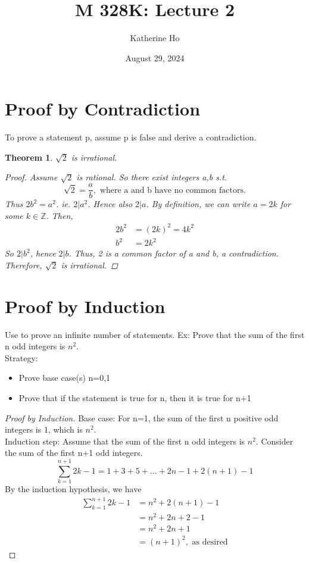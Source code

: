 \documentclass[letterpaper]{article}
\title{M 328K: Lecture 2}
\author{Katherine Ho}
\date{August 29, 2024}
\newtheorem{theorem}{Theorem}[section]
\begin{document}
\maketitle

\section{Proof by Contradiction}
    To prove a statement p, assume p is false and derive a contradiction.
    \begin{theorem}
        $\sqrt{2}$ is irrational.
        \begin{proof}
            Assume $\sqrt{2}$ is rational.
            So there exist integers a,b s.t. 
            \[
                \sqrt{2} = \frac{a}{b}, \text{ where a and b have no common factors.}
            \]
            Thus $2b^2=a^2$. ie. $2|a^2$.
            Hence also $2|a$. By definition, we can write $a=2k$ for some $k\in\mathbb{Z}$.
            Then,
            \begin{align*}
                2b^2 &= (2k)^2 = 4k^2 \\
                b^2 &= 2k^2
            \end{align*}
            So $2|b^2$, hence $2|b$.
            Thus, 2 is a common factor of a and b, a contradiction. \\
            Therefore, $\sqrt{2}$ is irrational.
        \end{proof}
    \end{theorem}

\section{Proof by Induction}
    Use to prove an infinite number of statements. 
    Ex: Prove that the sum of the first n odd integers is $n^2$. \\
    Strategy: 
    \begin{itemize}
        \item Prove base case(s) n=0,1
        \item Prove that if the statement is true for n, then it is true for n+1
    \end{itemize}

    \begin{proof} [Proof by Induction]
        Base case: For n=1, the sum of the first n positive odd integers is 1, which is $n^2$. \\
        Induction step: Assume that the sum of the first n odd integers is $n^2$.
        Consider the sum of the first n+1 odd integers.
        \[
            \sum_{k=1}^{n+1}2k-1 = 1+3+5+\dots+2n-1+2(n+1)-1
        \]
        By the induction hypothesis, we have
        \begin{align*}
            \sum_{k=1}^{n+1}2k-1 &= n^2+2(n+1)-1 \\
            &= n^2 + 2n + 2 - 1 \\
            &= n^2 + 2n + 1 \\
            &= (n+1)^2, \text{ as desired}
        \end{align*}
    \end{proof}
\end{document}
